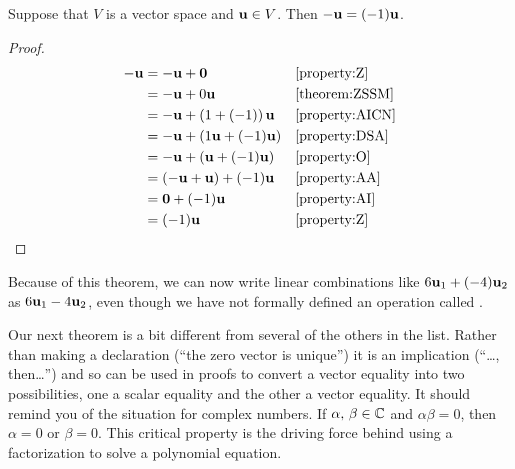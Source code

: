 \documentclass{ximera}
\begin{document}
\begin{theorem}
  \label{theorem:AISM}

  Suppose that $V$ is a vector space and $\mathbf{u}\in V$.  Then $\mathbf{-u}=(-1)\mathbf{u}$.

  \begin{proof}
    \begin{align*}
      \mathbf{-u}
      &=\mathbf{-u}+\mathbf{0}&&\ref{property:Z}\\
      &=\mathbf{-u}+0\mathbf{u}&&\ref{theorem:ZSSM}\\
      &=\mathbf{-u}+\left(1+(-1)\right)\mathbf{u}&&\ref{property:AICN}\\
&=\mathbf{-u}+\left(1\mathbf{u}+(-1)\mathbf{u}\right)&&\ref{property:DSA}\\
      &=\mathbf{-u}+\left(\mathbf{u}+(-1)\mathbf{u}\right)&&\ref{property:O}\\
      &=\left(\mathbf{-u}+\mathbf{u}\right)+(-1)\mathbf{u}&&\ref{property:AA}\\
      &=\mathbf{0}+(-1)\mathbf{u}&&\ref{property:AI}\\
      &=(-1)\mathbf{u}&&\ref{property:Z}
    \end{align*}
  \end{proof}
\end{theorem}

Because of this theorem, we can now write linear combinations like
$6\mathbf{u}_1+(-4)\mathbf{u}_2$ as $6\mathbf{u}_1-4\mathbf{u}_2$, even though
we have not formally defined an operation called .

Our next theorem is a bit different from several of the others in the
list.  Rather than making a declaration (``the zero vector is
unique'') it is an implication (``\ldots, then\ldots'') and so can be
used in proofs to convert a vector equality into two possibilities,
one a scalar equality and the other a vector equality.  It should
remind you of the situation for complex numbers.  If
$\alpha,\,\beta\in\mathbb{C}$ and $\alpha\beta=0$, then $\alpha=0$ or
$\beta=0$.  This critical property is the driving force behind using a
factorization to solve a polynomial equation.
\end{document}
